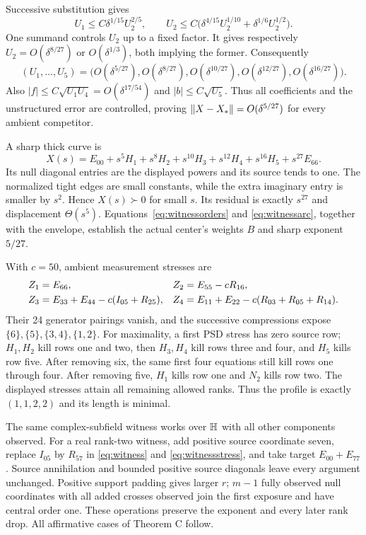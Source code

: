 Successive substitution gives
\[
 U_1\le C\delta^{1/15}U_2^{2/5},\qquad
 U_2\le C\bigl(\delta^{4/15}U_2^{1/10}+\delta^{1/6}U_2^{1/2}\bigr).
\]
One summand controls $U_2$ up to a fixed factor. It gives respectively $U_2=O(\delta^{8/27})$ or $O(\delta^{1/3})$, both implying the former. Consequently
\begin{equation}\label{eq:witnessorders}
(U_1,\ldots,U_5)=
\bigl(O(\delta^{5/27}),O(\delta^{8/27}),O(\delta^{10/27}),
O(\delta^{12/27}),O(\delta^{16/27})\bigr).
\end{equation}
Also $|f|\le C\sqrt{U_1U_4}=O(\delta^{17/54})$ and $|b|\le C\sqrt{U_5}$. Thus all coefficients and the unstructured error are controlled, proving $\lVert X-X_*\rVert=O(\delta^{5/27})$ for every ambient competitor.

A sharp thick curve is
\begin{equation}\label{eq:witnessarc}
X(s)=E_{00}+s^5H_1+s^8H_2+s^{10}H_3+s^{12}H_4+s^{16}H_5+s^{27}E_{66}.
\end{equation}
Its null diagonal entries are the displayed powers and its source tends to one. The normalized tight edges are small constants, while the extra imaginary entry is smaller by $s^2$. Hence $X(s)\succ0$ for small $s$. Its residual is exactly $s^{27}$ and displacement $\Theta(s^5)$. Equations~\eqref{eq:witnessorders} and \eqref{eq:witnessarc}, together with the envelope, establish the actual center's weights $B$ and sharp exponent $5/27$.

With $c=50$, ambient measurement stresses are
\begin{align}
Z_1&=E_{66},& Z_2&=E_{55}-cR_{16},\notag\\
Z_3&=E_{33}+E_{44}-c(I_{05}+R_{25}),&
Z_4&=E_{11}+E_{22}-c(R_{03}+R_{05}+R_{14}).\label{eq:witnessstress}
\end{align}
Their 24 generator pairings vanish, and the successive compressions expose $\{6\},\{5\},\{3,4\},\{1,2\}$. For maximality, a first PSD stress has zero source row; $H_1,H_2$ kill rows one and two, then $H_3,H_4$ kill rows three and four, and $H_5$ kills row five. After removing six, the same first four equations still kill rows one through four. After removing five, $H_1$ kills row one and $N_2$ kills row two. The displayed stresses attain all remaining allowed ranks. Thus the profile is exactly $(1,1,2,2)$ and its length is minimal.

The same complex-subfield witness works over $\mathbb H$ with all other components observed. For a real rank-two witness, add positive source coordinate seven, replace $I_{05}$ by $R_{57}$ in \eqref{eq:witness} and \eqref{eq:witnessstress}, and take target $E_{00}+E_{77}$. Source annihilation and bounded positive source diagonals leave every argument unchanged. Positive support padding gives larger $r$; $m-1$ fully observed null coordinates with all added crosses observed join the first exposure and have central order one. These operations preserve the exponent and every later rank drop. All affirmative cases of Theorem C follow.

